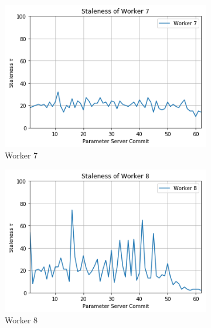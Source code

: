 \begin{figure}
\begin{subfigure}{.24\textwidth}
    \includegraphics[width=\linewidth]{resources/images/plots/adag_agn_mnist/epoch_40/15/001/staleness/worker_7}
    \caption{Worker 7}
  \end{subfigure}
  \begin{subfigure}{.24\textwidth}
    \centering
    \includegraphics[width=\linewidth]{resources/images/plots/adag_agn_mnist/epoch_40/15/001/staleness/worker_8}
    \caption{Worker 8}
  \end{subfigure}
  \begin{subfigure}{.24\textwidth}
    \centering

\end{subfigure}
\end{figure}
